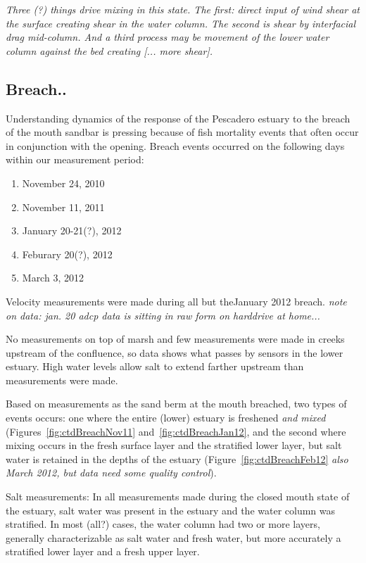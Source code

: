 \emph{Three (?) things drive mixing in this state. The first: direct input of wind shear at the surface creating shear in the water column.  The second is shear by interfacial drag mid-column. And a third process may be movement of the lower water column against the bed creating [... more shear].}




\subsection{Breach.. } \label{breach_dynamics}
Understanding dynamics of the response of the Pescadero estuary to the breach of the mouth sandbar is pressing because of fish mortality events that often occur in conjunction with the opening. Breach events occurred on the following days within our measurement period:
\begin{enumerate}
	\item November 24, 2010
	\item November 11, 2011
	\item January 20-21(?), 2012
	\item Feburary 20(?), 2012
	\item March 3, 2012
\end{enumerate}

Velocity measurements were made during all but theJanuary 2012 breach. \emph{note on data: jan. 20 adcp data is sitting in raw form on harddrive at home...}

No measurements on top of marsh and few measurements were made in
creeks upstream of the confluence, so data shows what passes by sensors in the lower estuary. High water
levels allow salt to extend farther upstream than measurements were made.

Based on measurements as the sand berm at the mouth breached, two types of events occurs: one where the entire (lower) estuary is freshened \emph{and mixed} (Figures~\ref{fig:ctdBreachNov11} and~\ref{fig:ctdBreachJan12}, and the second where mixing occurs in the fresh surface layer and the stratified lower layer, but salt water is retained in the depths of the estuary (Figure~\ref{fig:ctdBreachFeb12} \emph{also March 2012, but data need some quality control}).

Salt measurements:
In all measurements made during the closed mouth state of the estuary, salt water was present in the estuary and the water column was stratified. In most (all?) cases, the water column had two or more layers, generally characterizable as salt water and fresh water, but more accurately a stratified lower layer and a fresh upper layer. 

